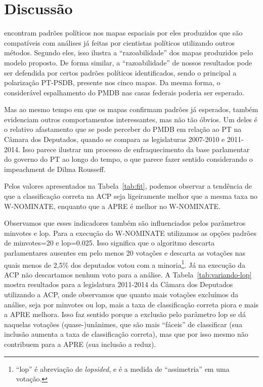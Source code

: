 \documentclass[
	article,			%
	12pt,				%
    twoside,			%
	a4paper,			%
	english,			%
	french,				%
	spanish,			%
	brazil,				%
	]{abntex2}
\newcommand\wnominate{W-NOMINATE\xspace}
\begin{document}
\section{Discussão}
\label{sec:discussao}

 encontram padrões políticos nos mapas espaciais por eles produzidos que são compatíveis com análises já feitas por cientistas políticos utilizando outros métodos. Segundo eles, isso ilustra a ``razoabilidade'' dos mapas produzidos pelo modelo proposto. 
De forma similar, a ``razoabilidade'' de nossos resultados pode ser defendida por certos padrões políticos identificados, sendo o principal a polarização PT-PSDB, presente nos cinco mapas. Da mesma forma, o considerável espalhamento do PMDB nas casas federais poderia ser esperado.

Mas ao mesmo tempo em que os mapas confirmam padrões já esperados, também evidenciam outros comportamentos interessantes, mas não tão óbvios. Um deles é o relativo afastamento que se pode perceber do PMDB em relação ao PT na Câmara dos Deputados, quando se compara as legislaturas 2007-2010 e 2011-2014. Isso parece ilustrar um processo de enfraquecimento da base parlamentar do governo do PT ao longo do tempo, o que parece fazer sentido considerando o impeachment de Dilma Rousseff.

Pelos valores apresentados na Tabela~\ref{tab:fit}, podemos observar a tendência de que a classificação correta na ACP seja ligeiramente melhor que a mesma taxa no \wnominate, enquanto que a APRE é melhor no \wnominate.

Observamos que esses indicadores também são influenciados pelos parâmetros \textsf{minvotes} e \textsf{lop}. Para a execução do \wnominate utilizamos as opções padrões de \textsf{minvotes=20} e \textsf{lop=0.025}. Isso significa que o algoritmo descarta parlamentares ausentes em pelo menos 20 votações e descarta as votações nas quais menos de 2,5\% dos deputados votou com a minoria\footnote{``lop'' é abreviação de \emph{lopsided}, e é a medida de ``assimetria'' em uma votação.}. Já na execução da ACP não descartamos nenhum voto para a análise. A Tabela~\ref{tab:variando-lop} mostra resultados para a legislatura 2011-2014 da Câmara dos Deputados utilizando a ACP, onde observamos que quanto mais votações excluímos da análise, seja por \textsf{minvotes} ou \textsf{lop}, mais a taxa de classificação correta piora e mais a APRE melhora. Isso faz sentido porque a exclusão pelo parâmetro \textsf{lop} se dá naquelas votações (quase-)unânimes, que são mais ``fáceis'' de classificar (sua inclusão aumenta a taxa de classificação correta), mas que por isso mesmo não contribuem para a APRE (sua inclusão a reduz). 
\end{document}
